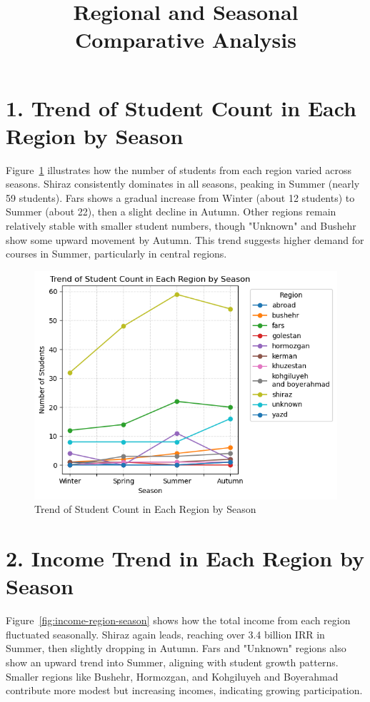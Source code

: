 \documentclass[12pt,a4paper]{article}
\title{Regional and Seasonal Comparative Analysis}
\date{}
\begin{document}
\maketitle

\section*{1. Trend of Student Count in Each Region by Season}
Figure~\ref{fig:student-count-region-season} illustrates how the number of students from each region varied across seasons. Shiraz consistently dominates in all seasons, peaking in Summer (nearly 59 students). Fars shows a gradual increase from Winter (about 12 students) to Summer (about 22), then a slight decline in Autumn. Other regions remain relatively stable with smaller student numbers, though "Unknown" and Bushehr show some upward movement by Autumn. This trend suggests higher demand for courses in Summer, particularly in central regions.

\begin{figure}[h!]
    \centering
    \includegraphics[width=1\textwidth]{Trend of Student Count in Each Region by Season.png}
    \caption{Trend of Student Count in Each Region by Season}
    \label{fig:student-count-region-season}
\end{figure}

\section*{2. Income Trend in Each Region by Season}
Figure~\ref{fig:income-region-season} shows how the total income from each region fluctuated seasonally. Shiraz again leads, reaching over 3.4 billion IRR in Summer, then slightly dropping in Autumn. Fars and "Unknown" regions also show an upward trend into Summer, aligning with student growth patterns. Smaller regions like Bushehr, Hormozgan, and Kohgiluyeh and Boyerahmad contribute more modest but increasing incomes, indicating growing participation.
\end{document}
